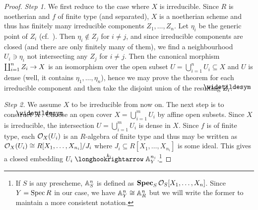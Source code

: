 \documentclass[a4paper,parskip=half,numbers=enddot, DIV=12]{scrreprt}
\begin{document}
\begin{proof}
	\emph{Step 1.} We first reduce to the case where $X$ is irreducible. Since $R$ is noetherian and $f$ of finite type (and separated), $X$ is a noetherian scheme and thus has finitely many irreducible components $Z_1,\ldots, Z_n$. Let $\eta_i$ be the generic point of $Z_i$ (cf.\ \cite[Fact~2.1.9]{alggeo1}). Then $\eta_i\notin Z_j$ for $i\neq j$, and since irreducible components are closed (and there are only finitely many of them), we find  a neighbourhood $U_i\ni \eta_i$ not intersecting any $Z_j$ for $i\neq j$. Then the canonical morphism $\coprod_{i=1}^nZ_i\morphism X$ is an isomorphism over the open subset $U=\bigcup_{i=1}^n U_i\subseteq X$ and $U$ is dense (well, it contains $\eta_1,\ldots,\eta_n$), hence we may prove the theorem for each irreducible component and then take the disjoint union of the resulting $\snake{Z}_i$.
	
	\emph{Step 2.} We assume $X$ to be irreducible from now on. The next step is to construct $\snake{X}$. Choose an open cover $X=\bigcup_{i=1}^mU_i$ by affine open subsets. Since $X$ is irreducible, the intersection $U=\bigcup_{i=1}^mU_i$ is dense in $X$. Since $f$ is of finite type, each $\mathcal{O}_X(U_i)$ is an $R$-algebra of finite type and thus may be written as $\mathcal{O}_X(U_i)\cong R[X_1,\ldots,X_{n_i}]/J_i$ where $J_i\subseteq R[X_1,\ldots,X_{n_i}]$ is some ideal. This gives a closed embedding $U_i\monomorphism[k_i]\IA_Y^{n_i}$.\footnote{If $S$ is any prescheme, $\mathbb{A}_S^n$ is defined as $\operatorname{\mathbf{Spec}}_S\mathcal{O}_S[X_1,\ldots,X_n]$. Since $Y=\operatorname{Spec} R$ in our case, we have $\mathbb{A}_Y^n\cong\mathbb{A}_R^n$ but we will write the former to maintain a more consistent notation.}
	

\end{proof}
\end{document}
